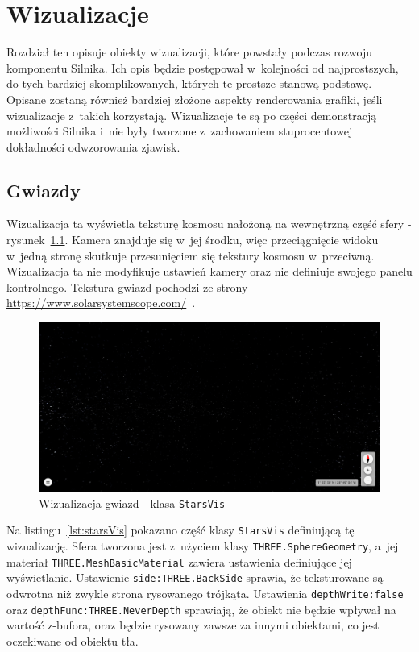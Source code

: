 \chapter{Wizualizacje}

Rozdział ten opisuje obiekty wizualizacji, które powstały podczas rozwoju komponentu Silnika. Ich opis będzie postępował w~kolejności od najprostszych, do tych bardziej skomplikowanych, których te prostsze stanową podstawę. Opisane zostaną również bardziej złożone aspekty renderowania grafiki, jeśli wizualizacje z~takich korzystają.
Wizualizacje te są po części demonstracją możliwości Silnika i~nie były tworzone z~zachowaniem stuprocentowej dokładności odwzorowania zjawisk.

\section{Gwiazdy}

Wizualizacja ta wyświetla teksturę kosmosu nałożoną na wewnętrzną część sfery - rysunek~\ref{fig:c4_starsVis}. Kamera znajduje się w~jej środku, więc przeciągnięcie widoku w~jedną stronę skutkuje przesunięciem się tekstury kosmosu w~przeciwną. Wizualizacja ta nie modyfikuje ustawień kamery oraz nie definiuje swojego panelu kontrolnego. Tekstura gwiazd pochodzi ze strony \url{https://www.solarsystemscope.com/}~\cite{SolarTextures}. 

\begin{figure}[h]
  \centering
  \includegraphics[width=\linewidth]{img/c4_starsVis.png}
  \caption{Wizualizacja gwiazd - klasa \texttt{StarsVis}}
  \label{fig:c4_starsVis} 
\end{figure}

Na listingu~\ref{lst:starsVis} pokazano część klasy \texttt{StarsVis} definiującą tę wizualizację. Sfera tworzona jest z~użyciem klasy \texttt{THREE.SphereGeometry}, a~jej materiał \texttt{THREE.MeshBasicMaterial} zawiera ustawienia definiujące jej wyświetlanie. Ustawienie \mbox{\texttt{side:THREE.BackSide}} sprawia, że teksturowane są odwrotna niż zwykle strona rysowanego trójkąta. Ustawienia \mbox{\texttt{depthWrite:false}} oraz \mbox{\texttt{depthFunc:THREE.NeverDepth}} sprawiają, że obiekt nie będzie wpływał na wartość z-bufora, oraz będzie rysowany zawsze za innymi obiektami, co jest oczekiwane od obiektu tła. 


